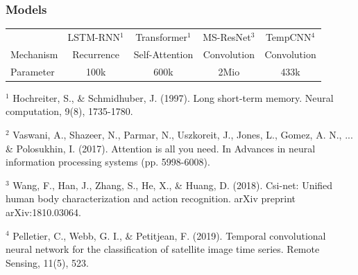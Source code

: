 \begin{frame}
\frametitle{Models}

\centering\begin{tabular}{lcccc}
	\toprule
	& LSTM-RNN$^1$ & Transformer$^1$ & MS-ResNet$^3$ & TempCNN$^4$ \\
	\cmidrule(lr){2-2}\cmidrule(lr){3-3}\cmidrule(lr){4-4}\cmidrule(lr){5-5}
	Mechanism & Recurrence & Self-Attention & Convolution & Convolution \\
	Parameter & 100k & 600k & 2Mio & 433k \\
	\bottomrule
\end{tabular}

\vspace{2em}

{\small\raggedright

$^1$ Hochreiter, S., \& Schmidhuber, J. (1997). Long short-term memory. Neural computation, 9(8), 1735-1780.

$^2$ Vaswani, A., Shazeer, N., Parmar, N., Uszkoreit, J., Jones, L., Gomez, A. N., ... \& Polosukhin, I. (2017). Attention is all you need. In Advances in neural information processing systems (pp. 5998-6008).

$^3$ Wang, F., Han, J., Zhang, S., He, X., \& Huang, D. (2018). Csi-net: Unified human body characterization and action recognition. arXiv preprint arXiv:1810.03064.

$^4$ Pelletier, C., Webb, G. I., \& Petitjean, F. (2019). Temporal convolutional neural network for the classification of satellite image time series. Remote Sensing, 11(5), 523.

}

\end{frame}


